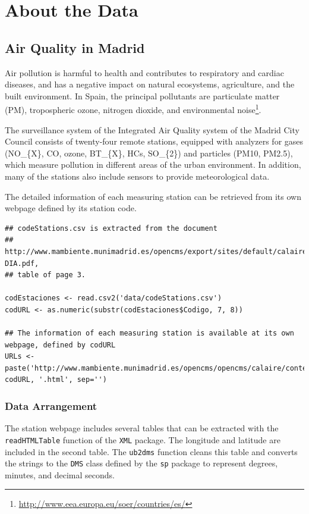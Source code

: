 \documentclass[smallroyalvopaper]{memoir}
\begin{document}
\chapter{About the Data}
\label{sec:orga59e527}
\label{cha:dataSpatial}

\section{Air Quality in Madrid}
\label{sec-1}
\label{sec:airQualityData}

Air pollution is harmful to health and contributes to respiratory and
cardiac diseases, and has a negative impact on natural ecosystems,
agriculture, and the built environment. In Spain, the principal
pollutants are particulate matter (PM), tropospheric ozone, nitrogen
dioxide, and environmental noise\footnote{\url{http://www.eea.europa.eu/soer/countries/es/}}.

The surveillance system of the Integrated Air Quality system of the
Madrid City Council consists of twenty-four remote stations, equipped
with analyzers for gases (NO\_\{X\}, CO, ozone, BT\_\{X\}, HCs, SO\_\{2\}) and
particles (PM10, PM2.5), which measure pollution in different areas of
the urban environment. In addition, many of the stations also include
sensors to provide meteorological data.

The detailed information of each measuring station can be retrieved
from its own webpage defined by its station code.
\lstset{language=R,numbers=none}
\begin{lstlisting}
## codeStations.csv is extracted from the document
## http://www.mambiente.munimadrid.es/opencms/export/sites/default/calaire/Anexos/INTPHORA-DIA.pdf,
## table of page 3.

codEstaciones <- read.csv2('data/codeStations.csv')
codURL <- as.numeric(substr(codEstaciones$Codigo, 7, 8))

## The information of each measuring station is available at its own webpage, defined by codURL
URLs <- paste('http://www.mambiente.munimadrid.es/opencms/opencms/calaire/contenidos/estaciones/estacion', codURL, '.html', sep='')
\end{lstlisting}

\subsection{\floweroneleft Data Arrangement}
\label{sec-1-1}
The station webpage includes several tables that can be extracted with
the \texttt{readHTMLTable} function of the \texttt{XML} package.  The longitude and
latitude are included in the second table. The \texttt{ub2dms} function
cleans this table and converts the strings to the \texttt{DMS} class defined
by the \texttt{sp} package to represent degrees, minutes, and decimal
seconds.
\end{document}
